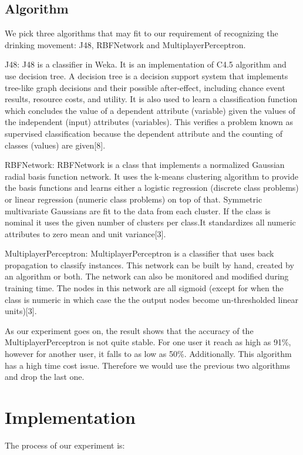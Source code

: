 \documentclass[12pt,twocolumn]{article}
\begin{document}
\subsection{Algorithm}
We pick three algorithms that may fit to our requirement of recognizing the drinking movement: J48, RBFNetwork and MultiplayerPerceptron\cite{Weka}.

J48: J48 is a classifier in Weka. It is an implementation of C4.5 algorithm and use decision tree. A decision tree is a decision support system that implements tree-like graph decisions and their possible after-effect, including chance event results, resource costs, and utility. It is also used to learn a classification function which concludes the value of a dependent attribute (variable) given the values of the independent (input) attributes (variables). This verifies a problem known as supervised classification because the dependent attribute and the counting of classes (values) are given[8].

RBFNetwork: RBFNetwork is a class that implements a normalized Gaussian radial basis function network. It uses the k-means clustering algorithm to provide the basis functions and learns either a logistic regression (discrete class problems) or linear regression (numeric class problems) on top of that. Symmetric multivariate Gaussians are fit to the data from each cluster. If the class is nominal it uses the given number of clusters per class.It standardizes all numeric attributes to zero mean and unit variance[3].

MultiplayerPerceptron: MultiplayerPerceptron is a classifier that uses back propagation to classify instances. This network can be built by hand, created by an algorithm or both. The network can also be monitored and modified during training time. The nodes in this network are all sigmoid (except for when the class is numeric in which case the the output nodes become un-thresholded linear units)[3].

As our experiment goes on, the result shows that the accuracy of the MultiplayerPerceptron is not quite stable. For one user it reach as high as 91\%, however for another user, it falls to as low as 50\%. Additionally. This algorithm has a high time cost issue. Therefore we would use the previous two algorithms and drop the last one.

\section{Implementation}
The process of our experiment is:
\end{document}
